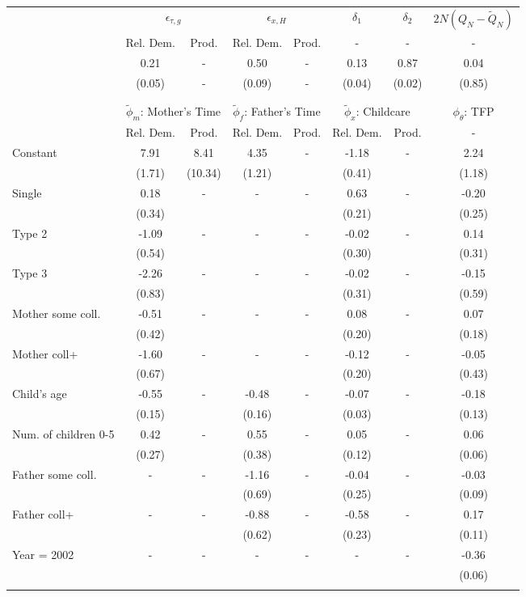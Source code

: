 \begin{tabular}{lccccccc}\toprule
 & \multicolumn{2}{c}{$\epsilon_{\tau,g}$} & \multicolumn{2}{c}{$\epsilon_{x,H}$} & {$\delta_{1}$} & {$\delta_{2}$} & $2N(Q_{N} - \tilde{Q}_{N})$ \\
 & Rel. Dem. & Prod. & Rel. Dem. & Prod. & - & - & - \\\cmidrule(r){2-3}\cmidrule(r){4-5}\cmidrule(r){6-6}\cmidrule(r){7-7}\cmidrule(r){8-8}
&0.21& - &0.50& - &0.13&0.87&0.04\\
&(0.05)& - &(0.09)& - &(0.04)&(0.02)&(0.85)\\
\\
&&&&&&&\\
 & \multicolumn{2}{c}{$\tilde{\phi}_{m}$: Mother's Time} & \multicolumn{2}{c}{$\tilde{\phi}_{f}$: Father's Time} & \multicolumn{2}{c}{$\tilde{\phi}_{x}$: Childcare} &{$\phi_{\theta}$: TFP} \\
 & Rel. Dem. & Prod. & Rel. Dem. & Prod. & Rel. Dem. & Prod. & -  \\\cmidrule(r){2-3}\cmidrule(r){4-5}\cmidrule(r){6-7}\cmidrule(r){8-8}
Constant&7.91&8.41&4.35& -&-1.18& -&2.24\\
&(1.71)&(10.34)&(1.21)&&(0.41)&&(1.18)\\
Single&0.18& -& - & -&0.63& -&-0.20\\
&(0.34)& & &&(0.21)&&(0.25)\\
Type 2&-1.09& -& - & -&-0.02& -&0.14\\
&(0.54)& & &&(0.30)&&(0.31)\\
Type 3&-2.26& -& - & -&-0.02& -&-0.15\\
&(0.83)& & &&(0.31)&&(0.59)\\
Mother some coll.&-0.51& -& - & -&0.08& -&0.07\\
&(0.42)& & &&(0.20)&&(0.18)\\
Mother coll+&-1.60& -& - & -&-0.12& -&-0.05\\
&(0.67)& & &&(0.20)&&(0.43)\\
Child's age&-0.55& -&-0.48& -&-0.07& -&-0.18\\
&(0.15)&&(0.16)&&(0.03)&&(0.13)\\
Num. of children 0-5&0.42& -&0.55& -&0.05& -&0.06\\
&(0.27)&&(0.38)&&(0.12)&&(0.06)\\
Father some coll.& - & -&-1.16& -&-0.04& -&-0.03\\
 & &&(0.69)&&(0.25)&&(0.09)\\
Father coll+& - & -&-0.88& -&-0.58& -&0.17\\
 & &&(0.62)&&(0.23)&&(0.11)\\
Year = 2002& - & -& - & -& - & -&-0.36\\
 & & & & & &&(0.06)\\
\\
\bottomrule\end{tabular}